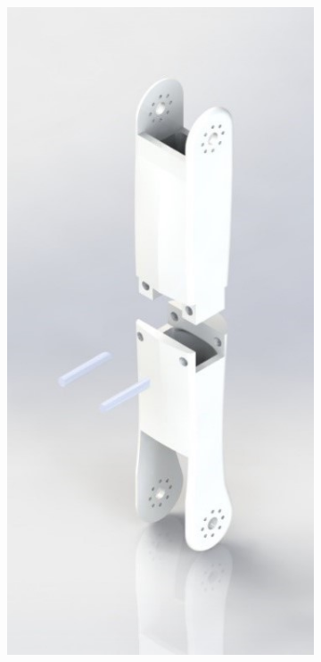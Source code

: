 \begin{figure}[h!]
    \centering
    \begin{subfigure}[b]{0.3\linewidth}
      \includegraphics[width=\linewidth]{chapter4/images/shin.jpg}

\end{subfigure}
\end{figure}
